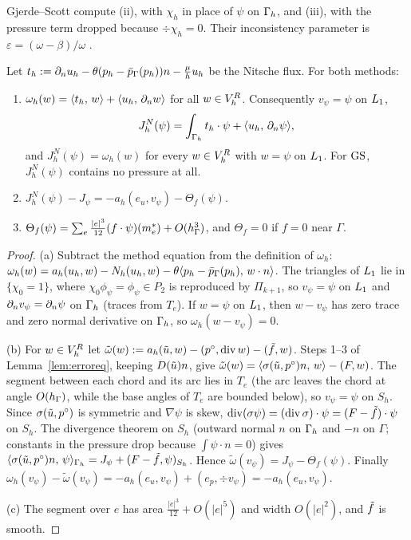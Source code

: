 Gjerde--Scott compute (ii), with $\chi_h$ in place of $\psi$ on $\Gamma_h$, and (iii), with the pressure term dropped because $\div\chi_h=0$. Their inconsistency parameter is $\varepsilon=(\omega-\beta)/\omega$ \cite[(10)]{GjerdeScott2024}.

\begin{lemma}\label{pd:lem:dragid}
Let $t_h:=\partial_n u_h-\theta(p_h-\bar p_{\Gamma}(p_h))n-\frac\mu hu_h$ be the Nitsche flux. For both methods:
\begin{enumerate}[label=(\alph*)]
\item $\omega_h(w)=\langle t_h,\, w\rangle+\langle u_h,\, \partial_n w\rangle$ for all $w\in V_h^R$. Consequently $v_\psi=\psi$ on $L_1$,
\[
J^N_h(\psi)=\int_{\Gamma_h}t_h\cdot\psi+\langle u_h,\, \partial_n\psi\rangle,
\]
and $J^N_h(\psi)=\omega_h(w)$ for every $w\in V_h^R$ with $w=\psi$ on $L_1$. For $\mathrm{GS}$, $J^N_h(\psi)$ contains no pressure at all.
\item $J^N_h(\psi)-J_\psi=-a_h(e_u,v_\psi)-\Theta_f(\psi)$.
\item $\Theta_f(\psi)=\sum_e\frac{|e|^3}{12}(f\cdot\psi)(m_e^\ast)+O(h_\Gamma^3)$, and $\Theta_f=0$ if $f=0$ near $\Gamma$.
\end{enumerate}
\end{lemma}

\begin{proof}
(a) Subtract the method equation from the definition of $\omega_h$: $\omega_h(w)=a_h(u_h,w)-N_h(u_h,w)-\theta\langle p_h-\bar p_{\Gamma}(p_h),\, w\cdot n\rangle$. The triangles of $L_1$ lie in $\{\chi_0=1\}$, where $\chi_0\phi_\psi=\phi_\psi\in P_2$ is reproduced by $\Pi_{k+1}$, so $v_\psi=\psi$ on $L_1$ and $\partial_n v_\psi=\partial_n\psi$ on $\Gamma_h$ (traces from $T_e$). If $w=\psi$ on $L_1$, then $w-v_\psi$ has zero trace and zero normal derivative on $\Gamma_h$, so $\omega_h(w-v_\psi)=0$.

(b) For $w\in V_h^R$ let $\tilde\omega(w):=a_h(\tilde u,w)-(p^\circ,\operatorname{div} w)-(\tilde f,w)$. Steps 1--3 of Lemma~\ref{lem:erroreq}, keeping $D(\tilde u)n$, give $\tilde\omega(w)=\langle \sigma(\tilde u,p^\circ)n,\, w\rangle-(F,w)$. The segment between each chord and its arc lies in $T_e$ (the arc leaves the chord at angle $O(h_\Gamma)$, while the base angles of $T_e$ are bounded below), so $v_\psi=\psi$ on $S_h$. Since $\sigma(\tilde u,p^\circ)$ is symmetric and $\nabla\psi$ is skew, $\operatorname{div}(\sigma\psi)=(\operatorname{div}\sigma)\cdot\psi=(F-\tilde f)\cdot\psi$ on $S_h$. The divergence theorem on $S_h$ (outward normal $n$ on $\Gamma_h$ and $-n$ on $\Gamma$; constants in the pressure drop because $\int\psi\cdot n=0$) gives $\langle \sigma(\tilde u,p^\circ)n,\, \psi\rangle_{\Gamma_h}=J_\psi+(F-\tilde f,\psi)_{S_h}$. Hence $\tilde\omega(v_\psi)=J_\psi-\Theta_f(\psi)$. Finally $\omega_h(v_\psi)-\tilde\omega(v_\psi)=-a_h(e_u,v_\psi)+(e_p,\div v_\psi)=-a_h(e_u,v_\psi)$.

(c) The segment over $e$ has area $\frac{|e|^3}{12}+O(|e|^5)$ and width $O(|e|^2)$, and $\tilde f$ is smooth.
\end{proof}

